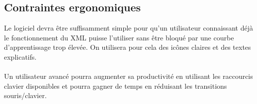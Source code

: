 \subsection{Contraintes ergonomiques}
Le logiciel devra être suffisamment simple pour qu'un utilisateur connaissant déjà le fonctionnement du XML puisse l'utiliser sans être bloqué par une courbe d'apprentissage trop élevée. On utilisera pour cela des icônes claires et des textes explicatifs.
\paragraph{}
Un utilisateur avancé pourra augmenter sa productivité en utilisant les raccourcis clavier disponibles et pourra gagner de temps en réduisant les transitions souris/clavier.
